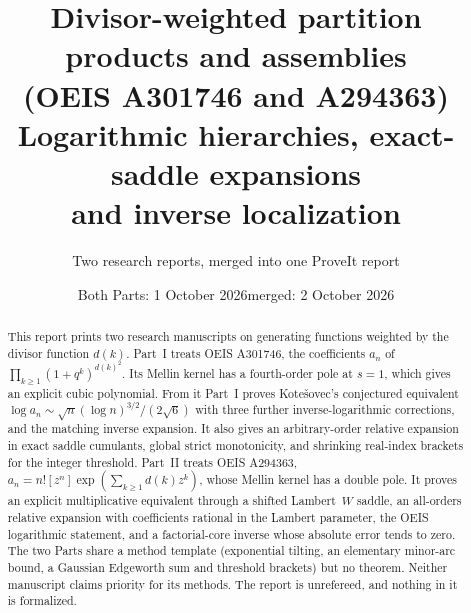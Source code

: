 \documentclass[11pt,letterpaper]{article}
\title{Divisor-weighted partition products and assemblies\\ (OEIS A301746 and A294363)\\[4pt]
\large Logarithmic hierarchies, exact-saddle expansions\\ and inverse localization}
\author{Two research reports, merged into one ProveIt report}
\date{Both Parts: 1 October 2026\quad merged: 2 October 2026}
\numberwithin{equation}{section}
\theoremstyle{remark}
\begin{document}
\hypersetup{pageanchor=false}
\maketitle
\begin{abstract}
This report prints two research manuscripts on generating functions weighted by the divisor function $d(k)$. Part~I treats OEIS A301746, the coefficients $a_n$ of $\prod_{k\ge1}(1+q^k)^{d(k)^2}$. Its Mellin kernel has a fourth-order pole at $s=1$, which gives an explicit cubic polynomial. From it Part~I proves Kote\v{s}ovec's conjectured equivalent $\log a_n\sim\sqrt n(\log n)^{3/2}/(2\sqrt6)$ with three further inverse-logarithmic corrections, and the matching inverse expansion. It also gives an arbitrary-order relative expansion in exact saddle cumulants, global strict monotonicity, and shrinking real-index brackets for the integer threshold. Part~II treats OEIS A294363, $a_n=n![z^n]\exp(\sum_{k\ge1}d(k)z^k)$, whose Mellin kernel has a double pole. It proves an explicit multiplicative equivalent through a shifted Lambert~$W$ saddle, an all-orders relative expansion with coefficients rational in the Lambert parameter, the OEIS logarithmic statement, and a factorial-core inverse whose absolute error tends to zero. The two Parts share a method template (exponential tilting, an elementary minor-arc bound, a Gaussian Edgeworth sum and threshold brackets) but no theorem. Neither manuscript claims priority for its methods. The report is unrefereed, and nothing in it is formalized.
\end{abstract}
\hypersetup{pageanchor=true}
\setcounter{tocdepth}{1}
\tableofcontents
\newpage
\end{document}
